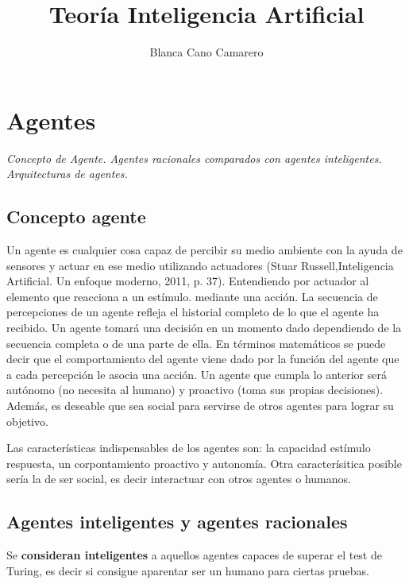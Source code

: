 \documentclass[a4paper]{article}
\title{Teoría Inteligencia Artificial}
\author{Blanca Cano Camarero}
\begin{document}
\begin{titlepage}
\maketitle
\tableofcontents

\end{titlepage}




\section{Agentes}
    \textit{Concepto de Agente. Agentes racionales comparados con  agentes inteligentes. Arquitecturas de agentes.}

\subsection{Concepto agente}

Un agente es cualquier cosa capaz de percibir su medio ambiente con la ayuda de sensores 
y actuar en ese medio utilizando actuadores (Stuar Russell,Inteligencia Artificial. Un enfoque moderno, 2011, p. 37).
Entendiendo por actuador al elemento que reacciona a un estímulo. 
mediante una acción. La secuencia de percepciones de un agente refleja el historial 
completo de lo que el agente ha recibido. Un agente tomará una decisión en un momento dado
 dependiendo de la secuencia completa 
o de una parte de ella. En términos matemáticos se puede decir que el comportamiento del 
agente viene dado por la función del agente que a cada percepción le asocia una acción. 
Un agente que cumpla lo anterior será autónomo (no necesita al humano) y proactivo (toma sus
 propias decisiones). Además, es deseable que sea social para servirse de otros agentes para
  lograr su objetivo.

Las características indispensables de los agentes son: la capacidad estímulo respuesta, 
un corpontamiento proactivo y autonomía. Otra caracterísitica posible 
sería la de ser social, es decir interactuar con otros agentes o humanos. 



\subsection{ Agentes inteligentes y agentes racionales}  

Se \textbf{consideran inteligentes} a aquellos agentes capaces de superar el test de Turing, es decir si consigue
 aparentar ser un humano para ciertas pruebas. \paragraph{}
\end{document}
